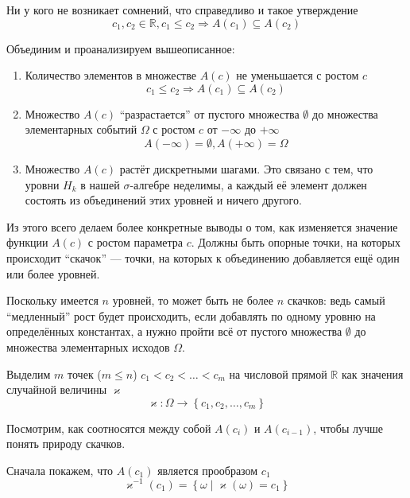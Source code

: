 Ни у кого не возникает сомнений, что справедливо и такое утверждение
$$c_1, c_2 \in \mathbb{R}, c_1 \le c_2
    \Rightarrow A\left( c_1 \right) \subseteq A\left( c_2 \right)$$

Объединим и проанализируем вышеописанное:
\begin{enumerate}
    \item Количество элементов в множестве $A\left( c \right)$
        не уменьшается с ростом $c$
        $$c_1 \le c_2
            \Rightarrow A\left( c_1 \right) \subseteq A\left( c_2 \right)$$

    \item Множество $A\left( c \right)$ ``разрастается''
        от пустого множества $\emptyset$
        до множества элементарных событий $\Omega$
        с ростом $c$ от $-\infty$ до $+\infty$
        $$A\left( -\infty \right)=\emptyset, A\left( +\infty \right)=\Omega$$

    \item Множество $A\left( c \right)$ растёт дискретными шагами.
        Это связано с тем, что уровни $H_k$ в нашей $\sigma$-алгебре неделимы,
        а каждый её элемент должен состоять из
        объединений этих уровней и ничего другого.
\end{enumerate}

Из этого всего делаем более конкретные выводы о том,
как изменяется значение функции $A\left( c \right)$ с ростом параметра $c$.
Должны быть опорные точки, на которых происходит ``скачок'' ---
точки, на которых к объединению добавляется ещё один или более уровней.

Поскольку имеется $n$ уровней, то может быть не более $n$ скачков:
ведь самый ``медленный'' рост будет происходить,
если добавлять по одному уровню на определённых константах,
а нужно пройти всё от пустого множества $\emptyset$
до множества элементарных исходов $\Omega$.

Выделим $m$ точек ($m \le n$) $c_1<c_2<\dots<c_m$
на числовой прямой $\mathbb{R}$ как значения случайной величины $\varkappa$
$$\varkappa: \Omega \rightarrow \left\{ c_1, c_2, \dots, c_m \right\}$$

Посмотрим, как соотносятся между собой
$A\left( c_i \right)$ и $A\left( c_{i-1} \right)$,
чтобы лучше понять природу скачков.

Сначала покажем, что $A\left( c_1 \right)$ является прообразом $c_1$
$$\varkappa^{-1}\left( c_1 \right)
    = \left\{ \omega \mid \varkappa\left( \omega \right) = c_1 \right\}$$

